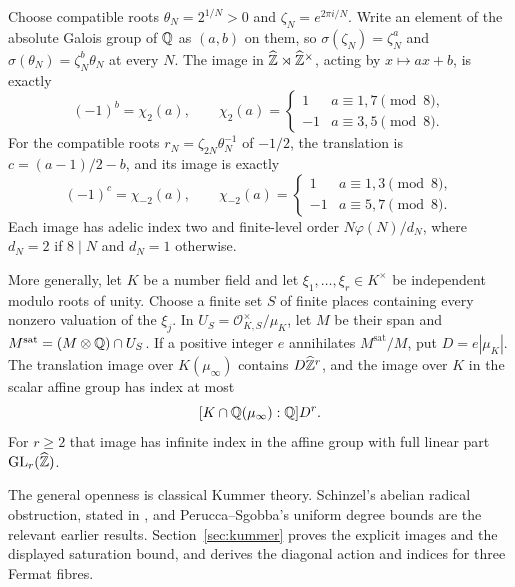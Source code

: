 \begin{theorem}
\label{thm:kummer-main}
Choose compatible roots $\theta_N=2^{1/N}>0$ and
$\zeta_N=e^{2\pi i/N}$. Write an element of the absolute Galois
group of $\mathbb Q$ as $(a,b)$ on them, so
$\sigma(\zeta_N)=\zeta_N^a$ and
$\sigma(\theta_N)=\zeta_N^b\theta_N$ at every $N$.
The image in $\widehat{\mathbb Z}\rtimes\widehat{\mathbb Z}^\times$, acting by
$x\mapsto ax+b$, is exactly
\[
 (-1)^b=\chi_2(a),\qquad
 \chi_2(a)=
 \begin{cases}1&a\equiv1,7\pmod8,\\-1&a\equiv3,5\pmod8.
 \end{cases}
\]
For the compatible roots $r_N=\zeta_{2N}\theta_N^{-1}$ of $-1/2$,
the translation is $c=(a-1)/2-b$, and its image is exactly
\[
 (-1)^c=\chi_{-2}(a),\qquad
 \chi_{-2}(a)=
 \begin{cases}1&a\equiv1,3\pmod8,\\-1&a\equiv5,7\pmod8.
 \end{cases}
\]
Each image has adelic index two and finite-level order
$N\varphi(N)/d_N$, where $d_N=2$ if $8\mid N$ and $d_N=1$
otherwise.

More generally, let $K$ be a number field and let
$\xi_1,\ldots,\xi_r\in K^\times$ be independent modulo roots of
unity. Choose a finite set $S$ of finite places containing every
nonzero valuation of the $\xi_j$. In
$U_S=\mathcal O_{K,S}^{\times}/\mu_K$, let $M$ be their span and
$M^{\mathrm{sat}}=(M\otimes\mathbb Q)\cap U_S$. If a positive integer $e$ annihilates
$M^{\mathrm{sat}}/M$, put $D=e|\mu_K|$.
The translation image over $K(\mu_\infty)$ contains
$D\widehat{\mathbb Z}^r$, and the image over $K$ in the scalar affine group
has index at most
\[
 [K\cap\mathbb Q(\mu_\infty):\mathbb Q]D^r.
\]
For $r\ge2$ that image has infinite index in the affine group with
full linear part $\operatorname{GL}_r(\widehat{\mathbb Z})$.
\end{theorem}
The general openness is classical Kummer theory. Schinzel's abelian
radical obstruction, stated in \cite[Theorem~15, p.~7]{PeruccaSgobba},
and Perucca--Sgobba's uniform degree bounds
\cite[Theorems~1 and~13, pp.~1 and~6--8]{PeruccaSgobba}
are the relevant earlier results. Section~\ref{sec:kummer} proves
the explicit images and the displayed saturation bound, and derives
the diagonal action and indices for three Fermat fibres.
